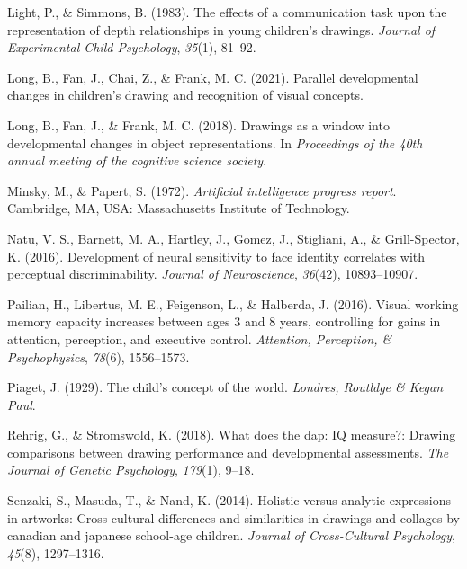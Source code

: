 \documentclass[
  english,
  man]{apa6}
\begin{document}
\leavevmode\hypertarget{ref-light1983effects}{}%
Light, P., \& Simmons, B. (1983). The effects of a communication task upon the representation of depth relationships in young children's drawings. \emph{Journal of Experimental Child Psychology}, \emph{35}(1), 81--92.

\leavevmode\hypertarget{ref-long2021parallel}{}%
Long, B., Fan, J., Chai, Z., \& Frank, M. C. (2021). Parallel developmental changes in children's drawing and recognition of visual concepts.

\leavevmode\hypertarget{ref-long2018drawings}{}%
Long, B., Fan, J., \& Frank, M. C. (2018). Drawings as a window into developmental changes in object representations. In \emph{Proceedings of the 40th annual meeting of the cognitive science society}.

\leavevmode\hypertarget{ref-minsky1972artificial}{}%
Minsky, M., \& Papert, S. (1972). \emph{Artificial intelligence progress report}. Cambridge, MA, USA: Massachusetts Institute of Technology.

\leavevmode\hypertarget{ref-natu2016development}{}%
Natu, V. S., Barnett, M. A., Hartley, J., Gomez, J., Stigliani, A., \& Grill-Spector, K. (2016). Development of neural sensitivity to face identity correlates with perceptual discriminability. \emph{Journal of Neuroscience}, \emph{36}(42), 10893--10907.

\leavevmode\hypertarget{ref-pailian2016visual}{}%
Pailian, H., Libertus, M. E., Feigenson, L., \& Halberda, J. (2016). Visual working memory capacity increases between ages 3 and 8 years, controlling for gains in attention, perception, and executive control. \emph{Attention, Perception, \& Psychophysics}, \emph{78}(6), 1556--1573.

\leavevmode\hypertarget{ref-piaget1929child}{}%
Piaget, J. (1929). The child's concept of the world. \emph{Londres, Routldge \& Kegan Paul}.

\leavevmode\hypertarget{ref-rehrig2018does}{}%
Rehrig, G., \& Stromswold, K. (2018). What does the dap: IQ measure?: Drawing comparisons between drawing performance and developmental assessments. \emph{The Journal of Genetic Psychology}, \emph{179}(1), 9--18.

\leavevmode\hypertarget{ref-senzaki2014holistic}{}%
Senzaki, S., Masuda, T., \& Nand, K. (2014). Holistic versus analytic expressions in artworks: Cross-cultural differences and similarities in drawings and collages by canadian and japanese school-age children. \emph{Journal of Cross-Cultural Psychology}, \emph{45}(8), 1297--1316.
\end{document}
